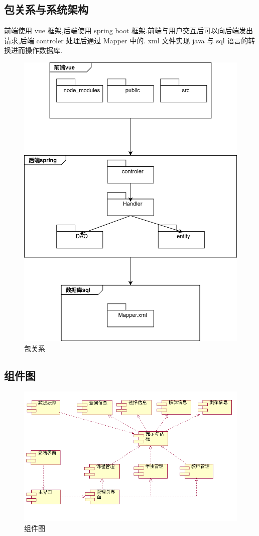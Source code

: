 \documentclass[12pt, a4paper]{article}
\begin{document}
\subsection{包关系与系统架构}
前端使用 vue 框架,后端使用 spring boot 框架.前端与用户交互后可以向后端发出请求,后端 controler 处理后通过 Mapper 中的.
xml 文件实现 java 与 sql 语言的转换进而操作数据库.
\begin{figure}[H]
  \centering
  \includegraphics[width = 0.8 \textwidth]{package.png}
  \caption{包关系}
\end{figure}

\subsection{组件图}
\begin{figure}[H]
  \centering
  \includegraphics[width = 0.8 \textwidth]{component.png}
  \caption{组件图}
\end{figure}
\end{document}
